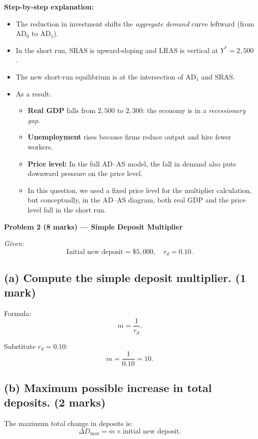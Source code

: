 \documentclass[12pt]{article}
\begin{document}
\textbf{Step-by-step explanation:}
\begin{itemize}
    \item The reduction in investment shifts the \emph{aggregate demand} curve leftward (from AD\(_0\) to AD\(_1\)).
    \item In the short run, SRAS is upward-sloping and LRAS is vertical at \(Y^* = 2{,}500\).
    \item The new short-run equilibrium is at the intersection of AD\(_1\) and SRAS.
    \item As a result:
    \begin{itemize}
        \item \textbf{Real GDP} falls from \(2{,}500\) to \(2{,}300\): the economy is in a \emph{recessionary gap}.
        \item \textbf{Unemployment} rises because firms reduce output and hire fewer workers.
        \item \textbf{Price level:} In the full AD--AS model, the fall in demand also puts downward pressure on the price level. 
        \item In this question, we used a fixed price level for the multiplier calculation, but conceptually, in the AD--AS diagram, both real GDP and the price level fall in the short run.
    \end{itemize}
\end{itemize}


\vspace{3em}

\textbf{Problem 2 (8 marks) --- Simple Deposit Multiplier}

\textit{Given:}
\[
\text{Initial new deposit} = \$5{,}000, \quad r_d = 0.10.
\]

\subsection*{(a) Compute the simple deposit multiplier. (1 mark)}

Formula:
\[
m = \frac{1}{r_d}.
\]

Substitute \(r_d = 0.10\):
\[
m = \frac{1}{0.10} = \boxed{10}.
\]

\subsection*{(b) Maximum possible increase in total deposits. (2 marks)}

The maximum total change in deposits is:
\[
\Delta D_{\max} = m \times \text{initial new deposit}.
\]
\end{document}
